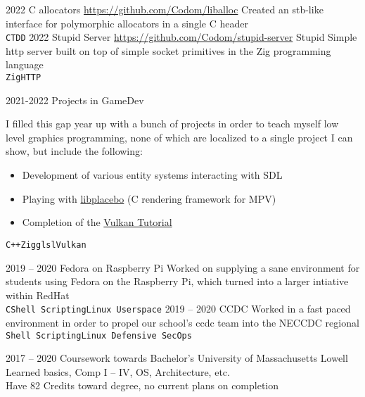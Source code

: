 \documentclass[9pt]{developercv} %
\begin{document}

\begin{entrylist}
	\entry
		{2022}
        {C allocators}
        {\href{https://github.com/Codom/liballoc}{https://github.com/Codom/liballoc}}
        {Created an stb-like interface for polymorphic allocators in a single C header\\
        \texttt{C}\slashsep\texttt{TDD}}
	\entry
		{2022}
        {Stupid Server}
        {\href{https://github.com/Codom/stupid-server}{https://github.com/Codom/stupid-server}}
        {Stupid Simple http server built on top of simple socket primitives
        in the Zig programming language\\
        \texttt{Zig}\slashsep\texttt{HTTP}}
\end{entrylist}


\begin{entrylist}
	\entry
		{2021-2022}
		{Projects in GameDev}
        {}
        {I filled this gap year up with a bunch of projects in order to teach myself low level graphics programming,
        none of which are localized to a single project I can show, but include the following:
        \begin{itemize}\itemsep=0em
            \item Development of various entity systems interacting with SDL
            \item Playing with \href{https://github.com/haasn/libplacebo}{libplacebo} (C rendering framework for MPV)
            \item Completion of the \href{https://github.com/Codom/Vulkan-Tutorial}{Vulkan Tutorial}
        \end{itemize}
        \texttt{C++}\slashsep\texttt{Zig}\slashsep\texttt{glsl}\slashsep\texttt{Vulkan}}
	\entry
		{2019 -- 2020}
		{Fedora on Raspberry Pi}
        {}
        {Worked on supplying a sane environment for students using Fedora on the Raspberry Pi,
        which turned into a larger intiative within RedHat \\
        \texttt{C}\slashsep\texttt{Shell Scripting}\slashsep\texttt{Linux Userspace}}
	\entry
		{2019 -- 2020}
		{CCDC}
        {}
        {Worked in a fast paced environment in order to propel our school's ccdc team into
        the NECCDC regional\\
        \texttt{Shell Scripting}\slashsep\texttt{Linux Defensive SecOps}}
\end{entrylist}




\begin{entrylist}
	\entry
		{2017 -- 2020}
		{Coursework towards Bachelor's}
		{University of Massachusetts Lowell}
		{
            Learned basics, Comp I -- IV, OS, Architecture, etc. \\
            Have 82 Credits toward degree, no current plans on completion
        }
\end{entrylist}
\end{document}
